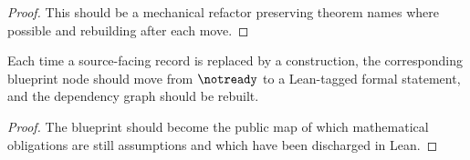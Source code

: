 \begin{proof}
  This should be a mechanical refactor preserving theorem names where possible
  and rebuilding after each move.
\end{proof}

\begin{proposition}
  \label{prop:keep-blueprint-synchronized}
  \notready
  Each time a source-facing record is replaced by a construction, the
  corresponding blueprint node should move from \(\notready\) to a Lean-tagged
  formal statement, and the dependency graph should be rebuilt.
\end{proposition}

\begin{proof}
  The blueprint should become the public map of which mathematical obligations
  are still assumptions and which have been discharged in Lean.
\end{proof}
